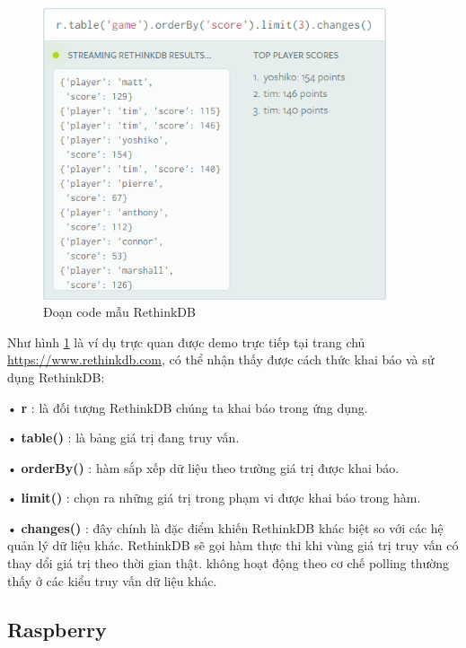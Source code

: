 \begin{figure}[H]
	\centering    
	\includegraphics[width=0.9\textwidth]{rethink1}
	\caption[Đoạn code mẫu RethinkDB]{Đoạn code mẫu RethinkDB}
	\label{fig: rethink1}
\end{figure}

Như hình \ref{fig: rethink1} là ví dụ trực quan được demo trực tiếp tại trang chủ \url{https://www.rethinkdb.com}, có thể nhận thấy được cách thức khai báo và sử dụng RethinkDB:

• \textbf{r} : là đối tượng RethinkDB chúng ta khai báo trong ứng dụng.

• \textbf{table()} : là bảng giá trị đang truy vấn.

• \textbf{orderBy()} : hàm sắp xếp dữ liệu theo trường giá trị được khai báo.

• \textbf{limit()} : chọn ra những giá trị trong phạm vi được khai báo trong hàm.

• \textbf{changes()} : đây chính là đặc điểm khiến RethinkDB khác biệt so với các hệ quản lý dữ liệu khác. RethinkDB sẽ gọi hàm thực thi khi vùng giá trị truy vấn có thay dổi giá trị theo thời gian thật. không hoạt động theo cơ chế polling thường thấy ở các kiểu truy vấn dữ liệu khác.

\subsection{Raspberry}

